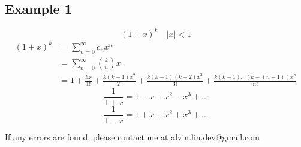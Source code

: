 \documentclass[letterpaper, 12pt]{math}
\begin{document}
\subsection*{Example 1}
\[ (1+x)^{k} \quad |x| < 1 \]
\begin{align*}
  (1+x)^{k} &= \sum_{n=0}^{\infty}c_{n}x^{n} \\
  &= \sum_{n=0}^{\infty}\binom{k}{n}x \\
  &= 1+\frac{kx}{1!}+\frac{k(k-1)x^{2}}{2!}+\frac{k(k-1)(k-2)x^{3}}{3!}
    +\frac{k(k-1)...(k-(n-1))x^{n}}{n!}
\end{align*}
\[ \frac{1}{1+x} = 1-x+x^{2}-x^{3}+... \]
\[ \frac{1}{1-x} = 1+x+x^{2}+x^{3}+... \]

\begin{center}
  If any errors are found, please contact me at alvin.lin.dev@gmail.com
\end{center}
\end{document}

